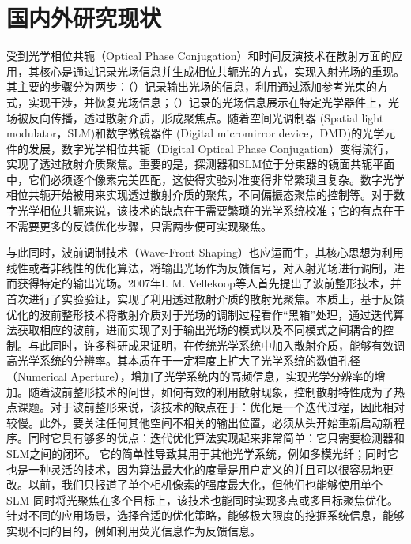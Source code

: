 \section{国内外研究现状}

受到光学相位共轭（Optical Phase Conjugation）和时间反演技术在散射方面的应用\cite{derode_robust_1995,draeger_one_channel_1997,leith_holographic_1966,fink_acoustic_2001}，其核心是通过记录光场信息并生成相位共轭光的方式，实现入射光场的重现。其主要的步骤分为两步：（）记录输出光场的信息，利用通过添加参考光束的方式，实现干涉，并恢复光场信息；（）记录的光场信息展示在特定光学器件上，光场被反向传播，透过散射介质，形成聚焦点。随着空间光调制器 (Spatial light modulator，SLM)和数字微镜器件 (Digital micromirror device，DMD)的光学元件的发展，数字光学相位共轭（Digital Optical Phase Conjugation）变得流行，实现了透过散射介质聚焦\cite{yaqoob_optical_2008,paurisse_phase_2009,cui_implementation_2010,lhermite_coherent_2010}。重要的是，探测器和SLM位于分束器的镜面共轭平面中，它们必须逐个像素完美匹配，这使得实验对准变得非常繁琐且复杂。数字光学相位共轭开始被用来实现透过散射介质的聚焦，不同偏振态聚焦的控制等。对于数字光学相位共轭来说，该技术的缺点在于需要繁琐的光学系统校准；它的有点在于不需要更多的反馈优化步骤，只需两步便可实现聚焦。

与此同时，波前调制技术（Wave-Front Shaping）\cite{Vellekoop2007}也应运而生，其核心思想为利用线性或者非线性的优化算法，将输出光场作为反馈信号，对入射光场进行调制，进而获得特定的输出光场。2007年I. M. Vellekoop等人\cite{Vellekoop2007}首先提出了波前整形技术，并首次进行了实验验证，实现了利用透过散射介质的散射光聚焦。本质上，基于反馈优化的波前整形技术将散射介质对于光场的调制过程看作“黑箱”处理，通过迭代算法获取相应的波前，进而实现了对于输出光场的模式以及不同模式之间耦合的控制。与此同时，许多科研成果证明，在传统光学系统中加入散射介质，能够有效调高光学系统的分辨率\cite{vellekoop_exploiting_2010,choi_overcoming_2011}。其本质在于一定程度上扩大了光学系统的数值孔径（Numerical Aperture），增加了光学系统内的高频信息，实现光学分辨率的增加。随着波前整形技术的问世，如何有效的利用散射现象，控制散射特性成为了热点课题。对于波前整形来说，该技术的缺点在于：优化是一个迭代过程，因此相对较慢。此外，要关注任何其他空间不相关的输出位置，必须从头开始重新启动新程序。同时它具有够多的优点：迭代优化算法实现起来非常简单：它只需要检测器和SLM之间的闭环。 它的简单性导致其用于其他光学系统，例如多模光纤；同时它也是一种灵活的技术，因为算法最大化的度量是用户定义的并且可以很容易地更改。以前，我们只报道了单个相机像素的强度最大化，但他们也能够使用单个 SLM 同时将光聚焦在多个目标上，该技术也能同时实现多点或多目标聚焦优化。针对不同的应用场景，选择合适的优化策略，能够极大限度的挖掘系统信息，能够实现不同的目的，例如利用荧光信息作为反馈信息\cite{boniface_non_invasive_2019}。

